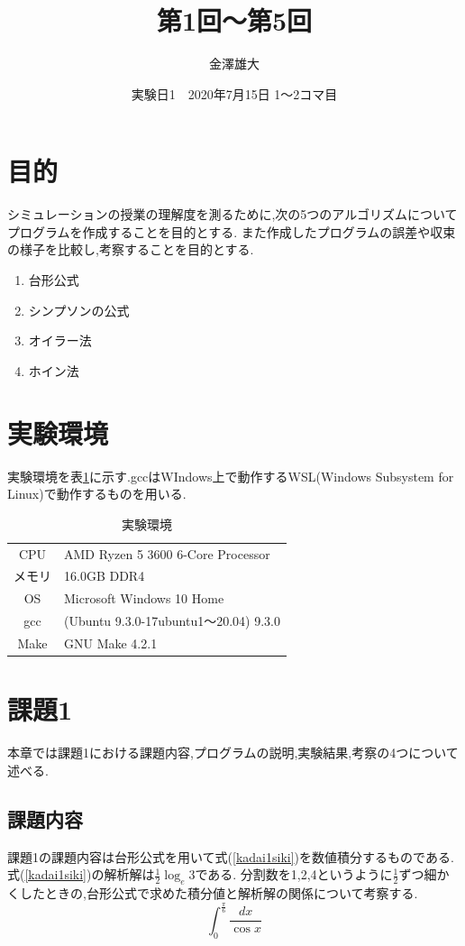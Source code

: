 \documentclass[dvipdfmx]{jarticle}
\title{第1回～第5回}
\date{実験日1　2020年7月15日 1～2コマ目}
\author{金澤雄大}
\begin{document}
    \maketitle
    \thispagestyle{empty}
    \clearpage
    \addtocounter{page}{-1}
    \section{目的}
    シミュレーションの授業の理解度を測るために,次の5つのアルゴリズムについてプログラムを作成することを目的とする.
    また作成したプログラムの誤差や収束の様子を比較し,考察することを目的とする.
  \begin{enumerate}
  \item 台形公式
  \item シンプソンの公式
  \item オイラー法
  \item ホイン法
  \end{enumerate}
  
    \section{実験環境}
      実験環境を表\ref{env}に示す.gccはWIndows上で動作するWSL(Windows Subsystem for Linux)で動作するものを用いる.
      \begin{table}[H]
        \caption{実験環境}
      \label{env}
      \begin{center}
          \begin{tabular}{c|l}\hline
            CPU & AMD Ryzen 5 3600 6-Core Processor \\ 
            メモリ & 16.0GB DDR4 \\
            OS & Microsoft Windows 10 Home \\
            gcc & (Ubuntu 9.3.0-17ubuntu1～20.04) 9.3.0 \\
            Make & GNU Make 4.2.1 \\ \hline
          \end{tabular}
      \end{center}
      \end{table}

    \section{課題1}
    本章では課題1における課題内容,プログラムの説明,実験結果,考察の4つについて述べる.
    \subsection{課題内容}
    課題1の課題内容は台形公式を用いて式(\ref{kadai1siki})を数値積分するものである.式(\ref{kadai1siki})の解析解は$\frac{1}{2} \log_{e} 3$である.
    分割数を1,2,4というように$\frac{1}{2}$ずつ細かくしたときの,台形公式で求めた積分値と解析解の関係について考察する.
    \begin{equation}
  \int_0^\frac{\pi}{6} \frac{dx}{\cos x}
      \label{kadai1siki}
    \end{equation}
\end{document}
